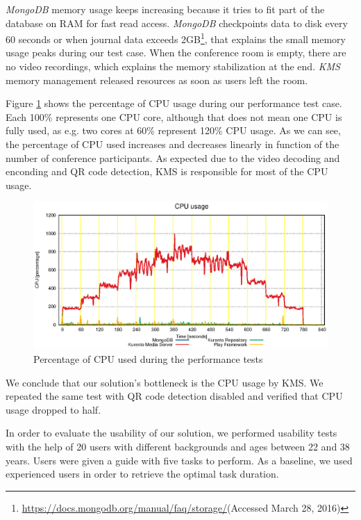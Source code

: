 \documentclass[10pt,conference]{IEEEtran}
\begin{document}
\emph{MongoDB} memory usage keeps increasing because it tries to fit part of the database on \gls{RAM} for fast read access.
\emph{MongoDB} checkpoints data to disk every 60 seconds or when journal data exceeds 2GB\footnote{\url{https://docs.mongodb.org/manual/faq/storage/}(Accessed March 28, 2016)}, that explains the small memory usage peaks during our test case.
When the conference room is empty, there are no video recordings, which explains the memory stabilization at the end.
\emph{KMS} memory management released resources as soon as users left the room. 


Figure \ref{fig:test_full_features_cpu} shows the percentage of \gls{CPU} usage during our performance test case. 
Each 100\% represents one \gls{CPU} core, although that does not mean one \gls{CPU} is fully used, as e.g. two cores at 60\% represent 120\% \gls{CPU} usage.
As we can see, the percentage of \gls{CPU} used increases and decreases linearly in function of the number of conference participants.
As expected due to the video decoding and enconding and \gls{QR} code detection, \gls{KMS} is responsible for most of the \gls{CPU} usage.


\begin{figure}
  \centering
  \includegraphics[width=\linewidth]{stats/test_full_features_cpu.eps}
  \caption{Percentage of CPU used during the performance tests}
  \label{fig:test_full_features_cpu}
\end{figure}

We conclude that our solution's bottleneck is the \gls{CPU} usage by \gls{KMS}.
We repeated the same test with \gls{QR} code detection disabled and verified that \gls{CPU} usage dropped to half.




In order to evaluate the usability of our solution, we performed usability tests with the help of 20 users with different backgrounds and ages between 22 and 38 years. 
Users were given a guide with five tasks to perform.
As a baseline, we used experienced users in order to retrieve the optimal task duration.
\end{document}
